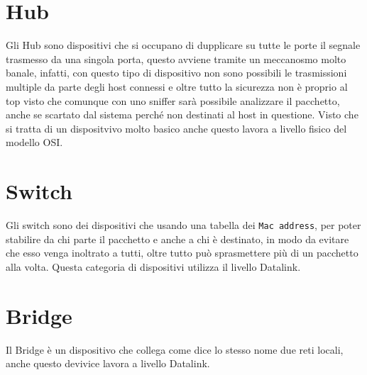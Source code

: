 \documentclass{book}
\theoremstyle{definition}
\begin{document}
\section{Hub}
\label{sec:hub}

Gli Hub sono dispositivi che si occupano di dupplicare su tutte le porte il segnale trasmesso da una singola porta, questo avviene tramite un meccanosmo molto banale, infatti, con questo tipo di dispositivo non sono possibili le trasmissioni multiple da parte degli host connessi e oltre tutto la sicurezza non è proprio al top visto che comunque con uno sniffer sarà possibile analizzare il pacchetto, anche se scartato dal sistema perché non destinati al host in questione. Visto che si tratta di un dispositvivo molto basico anche questo lavora a livello fisico del modello OSI.

\section{Switch}
\label{sec:switch}

Gli switch sono dei dispositivi che usando una tabella dei \texttt{Mac address}, per poter stabilire da chi parte il pacchetto e anche a chi è destinato, in modo da evitare che esso venga inoltrato a tutti, oltre tutto può sprasmettere più di un pacchetto alla volta. Questa categoria di dispositivi utilizza il livello Datalink.

\section{Bridge}
\label{sec:bridge}
Il Bridge è un dispositivo che collega come dice lo stesso nome due reti locali, anche questo devivice lavora a livello Datalink.
\end{document}
